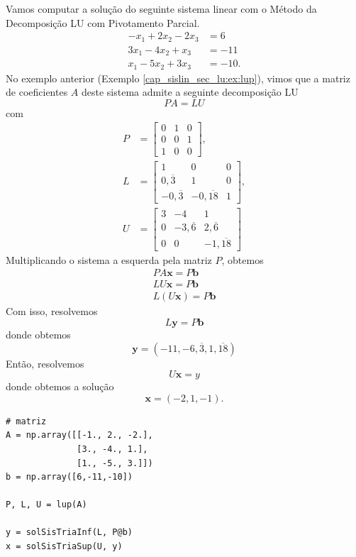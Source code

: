 \begin{ex}
  Vamos computar a solução do seguinte sistema linear com o Método da Decomposição LU com Pivotamento Parcial.
  \begin{align}
    -x_1 + 2x_2 - 2x_3 &= 6\\
    3x_1 - 4x_2 + x_3 &= -11\\
    x_1 - 5x_2 + 3x_3 &= -10.
  \end{align}
  No exemplo anterior (Exemplo \ref{cap_sislin_sec_lu:ex:lup}), vimos que a matriz de coeficientes $A$ deste sistema admite a seguinte decomposição LU
  \begin{equation}
    PA = LU
  \end{equation}
  com
  \begin{align}
    P &=
    \begin{bmatrix}
      0 & 1 & 0\\
      0 & 0 & 1\\
      1 & 0 & 0
    \end{bmatrix},\\
    L &=
    \begin{bmatrix}
      1 & 0 & 0\\
      0,\overline{3} & 1 & 0\\
      -0,\overline{3} & -0,\overline{18} & 1      
    \end{bmatrix},\\
    U &= 
    \begin{bmatrix}
      3 & -4 & 1\\
      0 & -3,\overline{6} & 2,\overline{6}\\
      0 & 0 & -1,\overline{18}
    \end{bmatrix}
  \end{align}
  Multiplicando o sistema a esquerda pela matriz $P$, obtemos
  \begin{gather}
    PA\pmb{x} = P\pmb{b}\\
    LU\pmb{x} = P\pmb{b}\\
    L(U\pmb{x}) = P\pmb{b}
  \end{gather}
  Com isso, resolvemos
  \begin{equation}
    L\pmb{y} = P\pmb{b}
  \end{equation}
  donde obtemos
  \begin{equation}
    \pmb{y} = (-11, -6,\overline{3}, 1,\overline{18})
  \end{equation}
  Então, resolvemos
  \begin{equation}
    U\pmb{x} = y
  \end{equation}
  donde obtemos a solução
  \begin{equation}
    \pmb{x} = (-2, 1, -1).
  \end{equation}
  
\begin{lstlisting}
# matriz
A = np.array([[-1., 2., -2.],
              [3., -4., 1.],
              [1., -5., 3.]])
b = np.array([6,-11,-10])

P, L, U = lup(A)

y = solSisTriaInf(L, P@b)
x = solSisTriaSup(U, y)
\end{lstlisting}
\end{ex}

